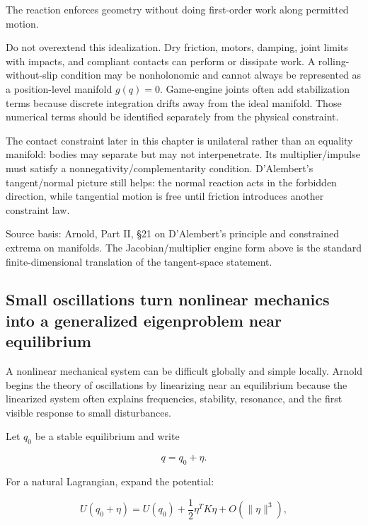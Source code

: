 The reaction enforces geometry without doing first-order work along permitted motion.

Do not overextend this idealization. Dry friction, motors, damping, joint limits with impacts, and compliant contacts can perform or dissipate work. A rolling-without-slip condition may be nonholonomic and cannot always be represented as a position-level manifold \(g(q)=0\). Game-engine joints often add stabilization terms because discrete integration drifts away from the ideal manifold. Those numerical terms should be identified separately from the physical constraint.

The contact constraint later in this chapter is unilateral rather than an equality manifold: bodies may separate but may not interpenetrate. Its multiplier/impulse must satisfy a nonnegativity/complementarity condition. D'Alembert's tangent/normal picture still helps: the normal reaction acts in the forbidden direction, while tangential motion is free until friction introduces another constraint law.

Source basis: Arnold, Part II, §21 on D'Alembert's principle and constrained extrema on manifolds. The Jacobian/multiplier engine form above is the standard finite-dimensional translation of the tangent-space statement.

\subsection{Small oscillations turn nonlinear mechanics into a generalized eigenproblem near equilibrium}\label{02-foundations-ii-ch039-small-oscillations-turn-nonlinear-mechanics-into-a-generalized-eigenproblem-near-equilibrium}

\hypertarget{02-foundations-ii-ch039-small-oscillations-turn-nonlinear-mechanics-into-a-generalized-eigenproblem-near-equilibrium}{}

A nonlinear mechanical system can be difficult globally and simple locally. Arnold begins the theory of oscillations by linearizing near an equilibrium because the linearized system often explains frequencies, stability, resonance, and the first visible response to small disturbances.

Let \(q_0\) be a stable equilibrium and write

\[
q=q_0+\eta.
\]

For a natural Lagrangian, expand the potential:

\[
U(q_0+\eta)
=
U(q_0)
+
\frac12\eta^T K\eta
+
O(\|\eta\|^3),
\]

